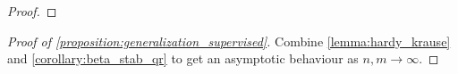 \begin{proof}
     \end{proof}


\begin{proof} [Proof of \cref{proposition:generalization_supervised}]
  Combine \cref{lemma:hardy_krause} and \cref{corollary:beta_stab_qr} to
  get an asymptotic behaviour as $n,m \to \infty$.
\end{proof}

